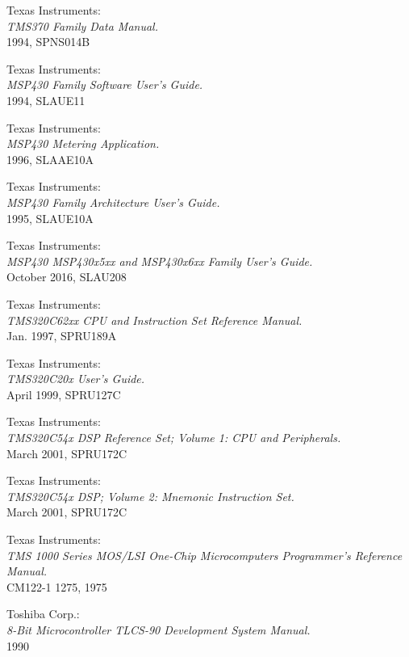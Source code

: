  Texas Instruments: \\
		{\em TMS370 Family Data Manual.\/} \\
		1994, SPNS014B

 Texas Instruments: \\
		{\em MSP430 Family Software User's Guide.\/} \\
		1994, SLAUE11

 Texas Instruments: \\
		{\em MSP430 Metering Application.\/} \\
		1996, SLAAE10A

 Texas Instruments: \\
		{\em MSP430 Family Architecture User's Guide.\/} \\
		1995, SLAUE10A

 Texas Instruments: \\
		{\em MSP430 MSP430x5xx and MSP430x6xx Family
		User's Guide.\/} \\
		October 2016, SLAU208

 Texas Instruments: \\
		{\em TMS320C62xx CPU and Instruction Set Reference Manual.\/} \\
		Jan. 1997, SPRU189A

 Texas Instruments: \\
		{\em TMS320C20x User's Guide.\/} \\
		April 1999, SPRU127C

 Texas Instruments: \\
		{\em TMS320C54x DSP Reference Set;
		Volume 1: CPU and Peripherals.\/} \\
		March 2001, SPRU172C

 Texas Instruments: \\
		{\em TMS320C54x DSP; Volume 2: Mnemonic Instruction
		Set.\/} \\
		March 2001, SPRU172C

 Texas Instruments: \\
		{\em TMS 1000 Series MOS/LSI One-Chip
		Microcomputers Programmer's Reference
		Manual.\/} \\
		CM122-1 1275, 1975

 Toshiba Corp.: \\
		{\em 8-Bit Microcontroller TLCS-90 Development System Manual.\/} \\
		1990


